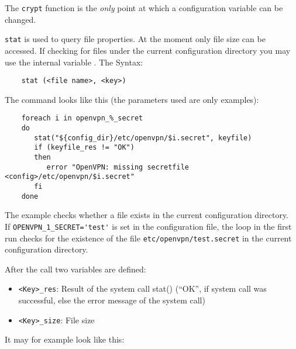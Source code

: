 The \texttt{crypt} function is the \emph{only} point at which a configuration
variable can be changed.


    \texttt{stat} is used to query file properties. At the moment only file
    size can be accessed. If checking for files under the current configuration
    directory you may use the internal variable . The Syntax:

\begin{example}
\begin{verbatim}
    stat (<file name>, <key>)
\end{verbatim}
\end{example}

    The command looks like this (the
    parameters used are only examples):

\begin{example}
\begin{verbatim}
    foreach i in openvpn_%_secret
    do
       stat("${config_dir}/etc/openvpn/$i.secret", keyfile)
       if (keyfile_res != "OK")
       then
          error "OpenVPN: missing secretfile <config>/etc/openvpn/$i.secret"
       fi
    done
\end{verbatim}
\end{example}

    The example checks whether a file exists in the current configuration directory.\\
    If \verb+OPENVPN_1_SECRET='test'+ is set in the configuration file, the loop
    in the first run checks for the existence of the file \texttt{etc/openvpn/test.secret}
    in the current configuration directory.

    After the call two variables are defined:

    \begin{itemize}
    \item \texttt{<Key>\_res}: Result of the system call stat() (``OK'', if
      system call was successful, else the error message of the system call)
    \item \texttt{<Key>\_size}: File size
    \end{itemize}

    It may for example look like this:

